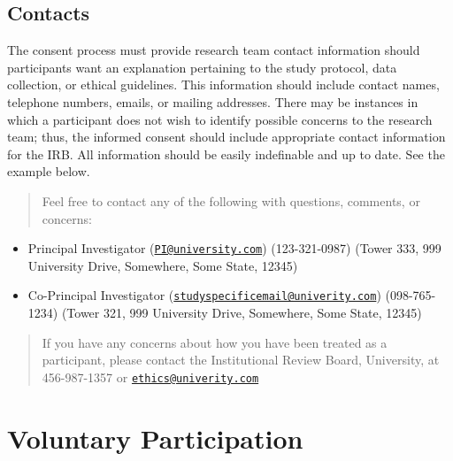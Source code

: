 \documentclass[
  11pt,
]{book}
\providecommand{\tightlist}{%
  \setlength{\itemsep}{0pt}\setlength{\parskip}{0pt}}
\begin{document}
\subsection{Contacts}\label{contacts}

The consent process must provide research team contact information should participants want an explanation pertaining to the study protocol, data collection, or ethical guidelines. This information should include contact names, telephone numbers, emails, or mailing addresses. There may be instances in which a participant does not wish to identify possible concerns to the research team; thus, the informed consent should include appropriate contact information for the IRB. All information should be easily indefinable and up to date. See the example below.

\begin{quote}
Feel free to contact any of the following with questions, comments, or concerns:
\end{quote}

\begin{itemize}
\tightlist
\item
  Principal Investigator (\href{mailto:PI@university.com}{\nolinkurl{PI@university.com}}) (123-321-0987) (Tower 333, 999 University Drive, Somewhere, Some State, 12345)
\item
  Co-Principal Investigator (\href{mailto:studyspecificemail@univerity.com}{\nolinkurl{studyspecificemail@univerity.com}}) (098-765-1234) (Tower 321, 999 University Drive, Somewhere, Some State, 12345)
\end{itemize}

\begin{quote}
If you have any concerns about how you have been treated as a participant, please contact the Institutional Review Board, University, at 456-987-1357 or \href{mailto:ethics@univerity.com}{\nolinkurl{ethics@univerity.com}}
\end{quote}

\section{Voluntary Participation}\label{voluntary-participation}
\end{document}
